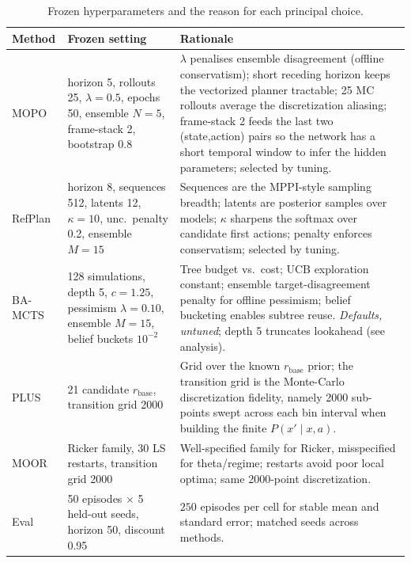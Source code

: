 \documentclass[11pt]{article}
\begin{document}
\begin{table}[h]
\centering\small
\caption{Frozen hyperparameters and the reason for each principal choice.}
\label{tab:hparams}
\begin{tabular}{@{}p{1.7cm}p{5.1cm}p{6.0cm}@{}}
\toprule
Method & Frozen setting & Rationale \\
\midrule
MOPO & horizon 5, rollouts 25, $\lambda{=}0.5$, epochs 50, ensemble $N{=}5$, frame-stack
2, bootstrap 0.8 &
$\lambda$ penalises ensemble disagreement (offline conservatism); short receding horizon
keeps the vectorized planner tractable; 25 MC rollouts average the discretization
aliasing; frame-stack 2 feeds the last two (state,action) pairs so the network has a
short temporal window to infer the hidden parameters; selected by tuning. \\
RefPlan & horizon 8, sequences 512, latents 12, $\kappa{=}10$, unc.\ penalty 0.2,
ensemble $M{=}15$ &
Sequences are the MPPI-style sampling breadth; latents are posterior samples over models;
$\kappa$ sharpens the softmax over candidate first actions; penalty enforces
conservatism; selected by tuning. \\
BA-MCTS & 128 simulations, depth 5, $c{=}1.25$, pessimism $\lambda{=}0.10$, ensemble
$M{=}15$, belief buckets $10^{-2}$ &
Tree budget vs.\ cost; UCB exploration constant; ensemble target-disagreement penalty for
offline pessimism; belief bucketing enables subtree reuse. \emph{Defaults, untuned};
depth 5 truncates lookahead (see analysis). \\
PLUS & 21 candidate $r_{\text{base}}$, transition grid 2000 &
Grid over the known $r_{\text{base}}$ prior; the transition grid is the Monte-Carlo
discretization fidelity, namely 2000 sub-points swept across each bin interval when
building the finite $P(x'\mid x,a)$. \\
MOOR & Ricker family, 30 LS restarts, transition grid 2000 &
Well-specified family for Ricker, misspecified for theta/regime; restarts avoid poor
local optima; same 2000-point discretization. \\
\midrule
Eval & 50 episodes $\times$ 5 held-out seeds, horizon 50, discount 0.95 &
$250$ episodes per cell for stable mean and standard error; matched seeds across methods. \\
\bottomrule
\end{tabular}
\end{table}
\end{document}
